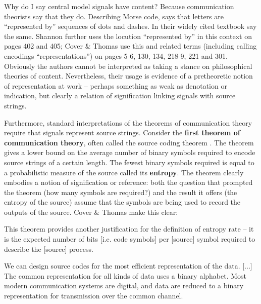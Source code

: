 \documentclass[12pt]{article}
\begin{document}
Why do I say central model signals have content?
Because communication theorists say that they do.
Describing Morse code, \citet[385]{shannon1948mathematicalc} says that letters are ``represented by'' sequences of dots and dashes.
In their widely cited textbook \citet[105]{cover2006elements} say the same.
Shannon further uses the locution ``represented by'' in this context on pages 402 and 405; Cover \& Thomas use this and related terms (including calling encodings ``representations'') on pages 5-6, 130, 134, 218-9, 221 and 301.
Obviously the authors cannot be interpreted as taking a stance on philosophical theories of content.
Nevertheless, their usage is evidence of a pretheoretic notion of representation at work -- perhaps something as weak as denotation or indication, but clearly a relation of signification linking signals with source strings.

Furthermore, standard interpretations of the theorems of communication theory require that signals represent source strings.
Consider the \textbf{first theorem of communication theory}, often called the source coding theorem \citep[$\S$5]{cover2006elements} \citep[$\S$4]{mackay2003information}.
The theorem gives a lower bound on the average number of binary symbols required to encode source strings of a certain length.
The fewest binary symbols required is equal to a probabilistic measure of the source called its \textbf{entropy}.
The theorem clearly embodies a notion of signification or reference: both the question that prompted the theorem (how many symbols are required?) and the result it offers (the entropy of the source) assume that the symbols are being used to record the outputs of the source.
Cover \& Thomas make this clear:

\begin{myquote}
This theorem provides another justification for the definition of entropy rate -- it is the expected number of bits [i.e. code symbols] per [source] symbol required to describe the [source] process.
\par\hspace*{\fill}\citet[115]{cover2006elements}
\end{myquote}

\begin{myquote}
We can design source codes for the most efficient representation of the data. [...] The common representation for all kinds of data uses a binary alphabet. Most modern communication systems are digital, and data are reduced to a binary representation for transmission over the common channel.
\par\hspace*{\fill}\citet[218]{cover2006elements}
\end{myquote}
\end{document}
